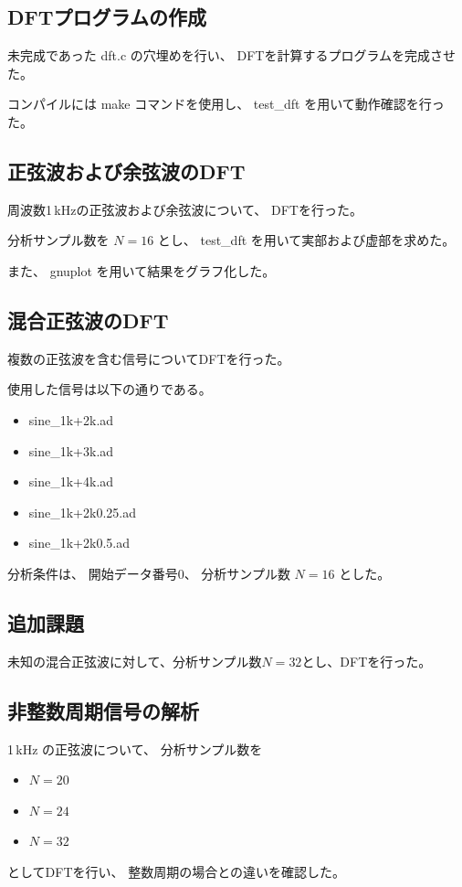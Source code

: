\documentclass{jsarticle}
\begin{document}
\subsection{DFTプログラムの作成}

未完成であった dft.c の穴埋めを行い、
DFTを計算するプログラムを完成させた。

コンパイルには make コマンドを使用し、
test\_dft を用いて動作確認を行った。

\subsection{正弦波および余弦波のDFT}

周波数1\,kHzの正弦波および余弦波について、
DFTを行った。

分析サンプル数を $N=16$ とし、
test\_dft を用いて実部および虚部を求めた。

また、
gnuplot を用いて結果をグラフ化した。

\subsection{混合正弦波のDFT}

複数の正弦波を含む信号についてDFTを行った。

使用した信号は以下の通りである。

\begin{itemize}
    \item sine\_1k+2k.ad
    \item sine\_1k+3k.ad
    \item sine\_1k+4k.ad
    \item sine\_1k+2k0.25.ad
    \item sine\_1k+2k0.5.ad
\end{itemize}

分析条件は、
開始データ番号0、
分析サンプル数 $N=16$ とした。

\subsection{追加課題}
未知の混合正弦波に対して、分析サンプル数$N=32$とし、DFTを行った。

\subsection{非整数周期信号の解析}

1\,kHz の正弦波について、
分析サンプル数を

\begin{itemize}
    \item $N=20$
    \item $N=24$
    \item $N=32$
\end{itemize}
としてDFTを行い、
整数周期の場合との違いを確認した。
\end{document}
